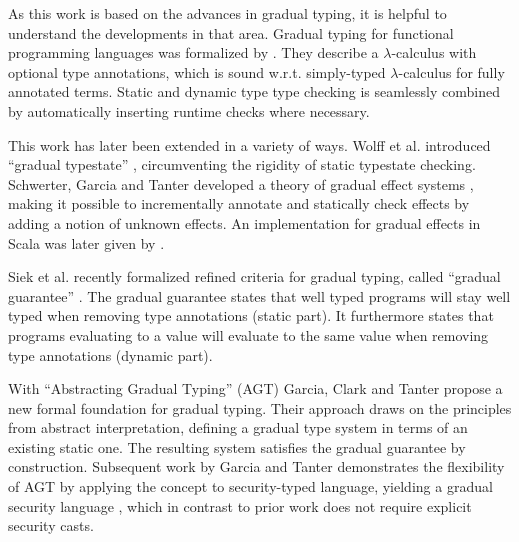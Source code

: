 As this work is based on the advances in gradual typing, it is helpful to understand the developments in that area.
Gradual typing for functional programming languages was formalized by \cite{siek2006gradual}.
They describe a $\lambda$-calculus with optional type annotations, which is sound w.r.t. simply-typed $\lambda$-calculus for fully annotated terms.
Static and dynamic type type checking is seamlessly combined by automatically inserting runtime checks where necessary.

This work has later been extended in a variety of ways.
Wolff et al. introduced “gradual typestate” \cite{wolff2011gradual}, circumventing the rigidity of static typestate checking.
Schwerter, Garcia and Tanter developed a theory of gradual effect systems \cite{banados2014theory}, making it possible to incrementally annotate and statically check effects by adding a notion of unknown effects.
An implementation for gradual effects in Scala was later given by \cite{toro2015customizable}.

\label{grad-guarantee}
Siek et al. recently formalized refined criteria for gradual typing, called “gradual guarantee” \cite{siek2015refined}.
The gradual guarantee states that well typed programs will stay well typed when removing type annotations (static part).
It furthermore states that programs evaluating to a value will evaluate to the same value when removing type annotations (dynamic part).


With “Abstracting Gradual Typing” (AGT) \cite{garcia2016abstracting} Garcia, Clark and Tanter propose a new formal foundation for gradual typing.
Their approach draws on the principles from abstract interpretation, defining a gradual type system in terms of an existing static one.
The resulting system satisfies the gradual guarantee by construction.
Subsequent work by Garcia and Tanter demonstrates the flexibility of AGT by applying the concept to security-typed language, yielding a gradual security language \cite{garcia2015deriving}, which in contrast to prior work does not require explicit security casts.
